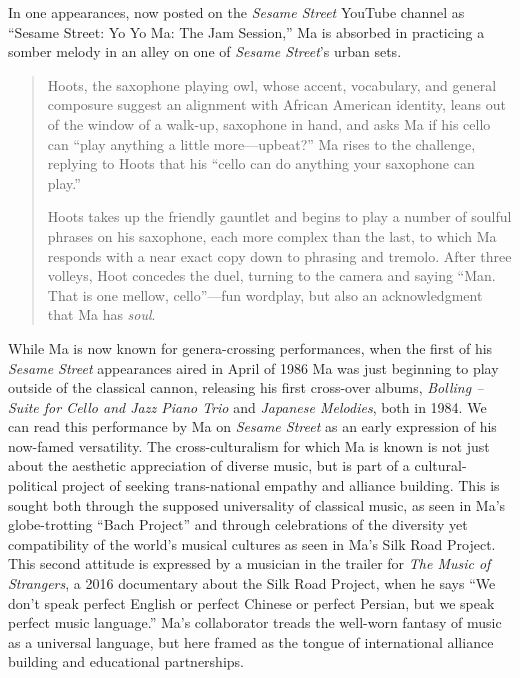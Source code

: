 \documentclass[12pt,letterpaper]{article}
\newcommand{\ses}{\textit{Sesame Street }}
\begin{document}
	In one appearances, now posted on the 
	\ses YouTube channel as ``Sesame Street: Yo Yo Ma: The Jam Session,'' 
	Ma is absorbed in practicing a somber melody in an alley on one of 
	\textit{Sesame Street}'s urban sets.

	\begin{quote}	
	Hoots, the saxophone playing owl, whose accent, vocabulary, and general
	composure suggest an alignment with African American identity, leans out
	of the window of a walk-up, saxophone in hand, and asks Ma if his cello
	can ``play anything a little more---upbeat?'' Ma rises to the challenge,
	replying to Hoots that his ``cello can do anything your saxophone can 
	play.''

	Hoots takes up the friendly gauntlet and begins to play a number of 
	soulful phrases on his saxophone, each more complex than the last, to 
	which Ma responds with a near exact copy down to phrasing and tremolo. 
	After three volleys, Hoot concedes the duel, turning to the camera and 
	saying ``Man. That is one mellow, cello''---fun wordplay, but also an 
	acknowledgment that Ma has \textit{soul}.

	\end{quote}

	While Ma is now known for genera-crossing performances, when the first
	of his \textit{Sesame Street} appearances aired in April of
	1986\autocite{2210} Ma was just beginning to play outside of the 
	classical cannon, releasing his first cross-over albums, 
	\textit{Bolling – Suite for Cello and Jazz Piano Trio} and 
	\textit{Japanese Melodies}, both in 1984.\autocite{MaSite} We can read 
	this performance by Ma on \textit{Sesame Street} as an early expression
	of his now-famed versatility. The cross-culturalism for which Ma is 
	known is not just about the aesthetic appreciation of diverse music, but
	is part of a cultural-political project of seeking trans-national 
	empathy and alliance building. This is sought both through the supposed 
	universality of classical music, as seen in Ma's globe-trotting 
	``Bach Project''\autocite{BachProject} and through celebrations of the 
	diversity yet compatibility of the world's musical cultures as seen in 
	Ma's Silk Road Project. This second attitude is expressed by a musician 
	in the trailer for \textit{The Music of Strangers}, a 2016 documentary 
	about the Silk Road Project, when he says ``We don't speak perfect 
	English or perfect Chinese or perfect Persian, but we speak perfect 
	music language.''\autocite{Strangers} Ma's collaborator treads the
	well-worn fantasy of music as a universal language, but here framed as
	the tongue of international alliance building and educational
	partnerships.
\end{document}
